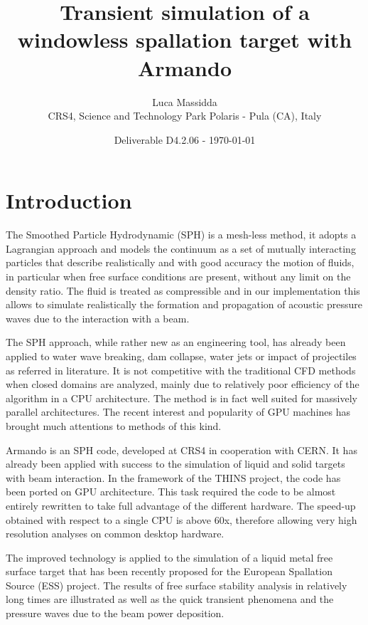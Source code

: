 \documentclass[a4paper, 11pt, twocolumn]{article}
\begin{document}
\title{Transient simulation of a windowless spallation target with Armando}
\author{Luca Massidda\\ CRS4, Science and Technology Park Polaris - Pula (CA), Italy}

\date{Deliverable D4.2.06 - \today}


\maketitle

\section{Introduction}
The Smoothed Particle Hydrodynamic (SPH) is a mesh-less method, it adopts a Lagrangian approach and models the continuum as a set of mutually interacting particles that describe realistically and with good accuracy the motion of fluids, in particular when free surface conditions are present, without any limit on the density ratio. The fluid is treated as compressible and in our implementation this allows to simulate realistically the formation and propagation of acoustic pressure waves due to the interaction with a beam.

The SPH approach, while rather new as an engineering tool, has already been applied to water wave breaking, dam collapse, water jets or impact of projectiles as referred in literature. It is not competitive with the traditional CFD methods when closed domains are analyzed, mainly due to relatively poor efficiency of the algorithm in a CPU architecture. The method is in fact well suited for massively parallel architectures. The recent interest and popularity of GPU machines has brought much attentions to methods of this kind.

Armando is an SPH code, developed at CRS4 in cooperation with CERN. It has already been applied with success to the simulation of liquid and solid targets with beam interaction. In the framework of the THINS project, the code has been ported on GPU architecture. This task required the code to be almost entirely rewritten to take full advantage of the different hardware. The speed-up obtained with respect to a single CPU is above 60x, therefore allowing very high resolution analyses on common desktop hardware.

The improved technology is applied to the simulation of a liquid metal free surface target that has been recently proposed for the European Spallation Source (ESS) project. The results of free surface stability analysis in relatively long times are illustrated as well as the quick transient phenomena and the pressure waves due to the beam power deposition.
\end{document}

